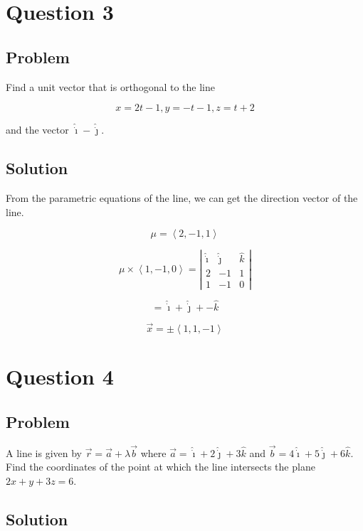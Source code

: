 \documentclass[12pt]{article}
\begin{document}
\section{Question 3}

\subsection{Problem}

Find a unit vector that is orthogonal to the line

\[
    x = 2t - 1, y = -t - 1, z = t + 2
\]

and the vector \(\hat{\dot{\imath}} - \hat{\dot{\jmath}}\).

\subsection{Solution}

From the parametric equations of the line, we can get the direction vector of the line.

\[
    \mu = \left\langle 2, -1, 1\right\rangle
\]

\[
    \mu \times \left\langle 1, -1, 0\right\rangle
    = \left\lvert
    \begin{array}{ccc}
        \hat{\dot{\imath}} & \hat{\dot{\jmath}} & \hat{k} \\
        2 & -1 & 1 \\
        1 & -1 & 0
    \end{array}
    \right\rvert
\]

\[
    = \hat{\dot{\imath}} + \hat{\dot{\jmath}} + -\hat{k}    
\]

\[
    \vec{x} = \pm \left\langle 1, 1, -1\right\rangle
\]

\section{Question 4}

\subsection{Problem}

A line is given by \(\vec{r} = \vec{a} + \lambda \vec{b}\)
where \(\vec{a} = \hat{\dot{\imath}} + 2 \hat{\dot{\jmath}} + 3 \hat{k}\)
and \(\vec{b} = 4 \hat{\dot{\imath}} + 5 \hat{\dot{\jmath}} + 6 \hat{k}\).
Find the coordinates of the point at which the line intersects the plane \(2x + y + 3z = 6\).

\subsection{Solution}
\end{document}

